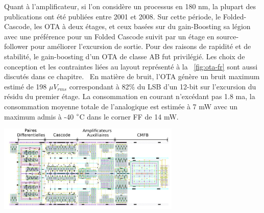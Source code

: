 \begin{mdframed}[linecolor=Prune,linewidth=1]
Quant à l'amplificateur, si l'on considère un processus en 180 nm, la plupart des publications ont été publiées entre 2001 et 2008. Sur cette période, le Folded-Cascode, les OTA à deux étages, et ceux basées sur du gain-Boosting sa légion avec une préférence pour un Folded Cascode suivit par un étage en source-follower pour améliorer l'excursion de sortie. Pour des raisons de rapidité et de stabilité, le gain-boosting d'un OTA de classe AB fut privilégié. Les choix de conception et les contraintes liées au layout représenté à la \figurename~\ref{fig:ota-fr} sont aussi discutés dans ce chapitre.  En matière de bruit, l'OTA génère un bruit maximum estimé de 198 \(\mu V _{rms} \) correspondant à 82\% du LSB d'un 12-bit sur l'excursion du résidu du premier étage. La consommation en courant n'excédant pas 1.8 ma, la consommation moyenne totale de l'analogique est estimée à 7 mW avec un maximum admis à -40 $\degree$C dans le corner FF de 14 mW.

\begin{center}
    \centering
    \includegraphics[width=0.65\textwidth]{Chapter7/Figs/layout_ota_v2-fr.png}
    \label{fig:ota-fr}
\end{center}


\end{mdframed}

